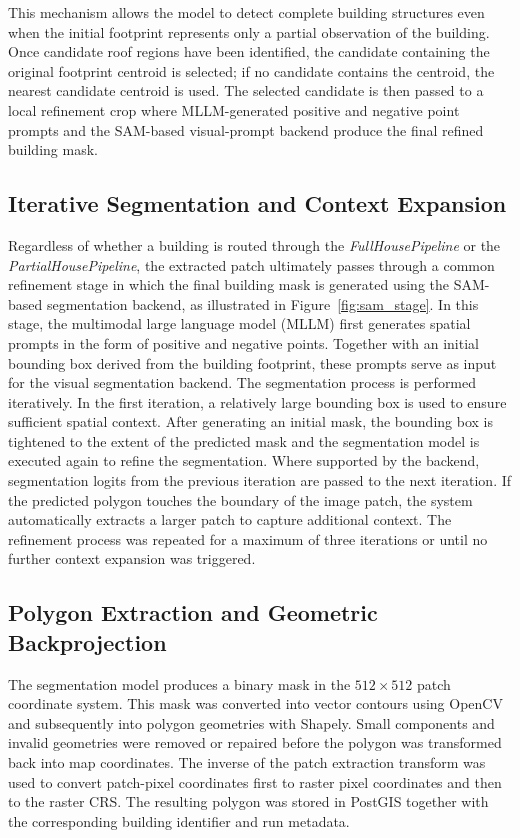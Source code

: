 This mechanism allows the model to detect complete building structures even when the initial footprint represents only a partial observation of the building. Once candidate roof regions have been identified, the candidate containing the original footprint centroid is selected; if no candidate contains the centroid, the nearest candidate centroid is used. The selected candidate is then passed to a local refinement crop where MLLM-generated positive and negative point prompts and the SAM-based visual-prompt backend produce the final refined building mask.
\subsection{Iterative Segmentation and Context Expansion}

Regardless of whether a building is routed through the \textit{FullHousePipeline} or the \textit{PartialHousePipeline}, the extracted patch ultimately passes through a common refinement stage in which the final building mask is generated using the SAM-based segmentation backend, as illustrated in Figure~\ref{fig:sam_stage}. In this stage, the multimodal large language model (MLLM) first generates spatial prompts in the form of positive and negative points. Together with an initial bounding box derived from the building footprint, these prompts serve as input for the visual segmentation backend. The segmentation process is performed iteratively. In the first iteration, a relatively large bounding box is used to ensure sufficient spatial context. After generating an initial mask, the bounding box is tightened to the extent of the predicted mask and the segmentation model is executed again to refine the segmentation. Where supported by the backend, segmentation logits from the previous iteration are passed to the next iteration. If the predicted polygon touches the boundary of the image patch, the system automatically extracts a larger patch to capture additional context. The refinement process was repeated for a maximum of three iterations or until no further context expansion was triggered.

\subsection{Polygon Extraction and Geometric Backprojection}

The segmentation model produces a binary mask in the \(512 \times 512\) patch coordinate system. This mask was converted into vector contours using OpenCV and subsequently into polygon geometries with Shapely. Small components and invalid geometries were removed or repaired before the polygon was transformed back into map coordinates. The inverse of the patch extraction transform was used to convert patch-pixel coordinates first to raster pixel coordinates and then to the raster CRS. The resulting polygon was stored in PostGIS together with the corresponding building identifier and run metadata.
